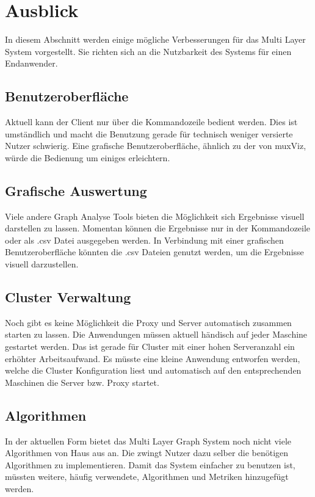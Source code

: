 \section{Ausblick}

In diesem Abschnitt werden einige mögliche Verbesserungen für das Multi Layer System vorgestellt.
Sie richten sich an die Nutzbarkeit des Systems für einen Endanwender.


\subsection{Benutzeroberfläche}

Aktuell kann der Client nur über die Kommandozeile bedient werden. Dies ist umständlich und macht die Benutzung gerade für technisch weniger versierte Nutzer schwierig.
Eine grafische Benutzeroberfläche, ähnlich zu der von muxViz, würde die Bedienung um einiges erleichtern. 

\subsection{Grafische Auswertung}

Viele andere Graph Analyse Tools bieten die Möglichkeit sich Ergebnisse visuell darstellen zu lassen. Momentan können die Ergebnisse nur in der Kommandozeile oder als .csv Datei ausgegeben werden.
In Verbindung mit einer grafischen Benutzeroberfläche könnten die .csv Dateien genutzt werden, um die Ergebnisse visuell darzustellen.

\subsection{Cluster Verwaltung}

Noch gibt es keine Möglichkeit die Proxy und Server automatisch zusammen starten zu lassen. Die Anwendungen müssen aktuell händisch auf jeder Maschine gestartet werden. Das ist gerade für Cluster mit einer hohen Serveranzahl ein erhöhter Arbeitsaufwand.
Es müsste eine kleine Anwendung entworfen werden, welche die Cluster Konfiguration liest und automatisch auf den entsprechenden Maschinen die Server bzw. Proxy startet.

\subsection{Algorithmen}

In der aktuellen Form bietet das Multi Layer Graph System noch nicht viele Algorithmen von Haus aus an. Die zwingt Nutzer dazu selber die benötigen Algorithmen zu implementieren. Damit das System einfacher zu benutzen ist,
müssten weitere, häufig verwendete, Algorithmen und Metriken hinzugefügt werden.

